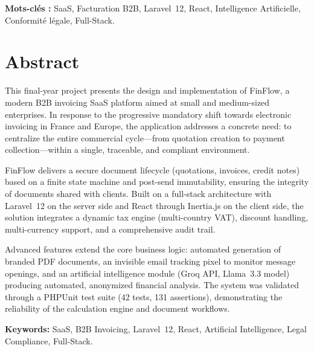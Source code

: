 \documentclass[12pt,a4paper]{report}
\begin{document}
\vspace{1em}
\noindent\textbf{Mots-clés :} SaaS, Facturation B2B, Laravel~12, React, Intelligence Artificielle, Conformité légale, Full-Stack.

\chapter*{Abstract}

This final-year project presents the design and implementation of FinFlow, a modern B2B invoicing SaaS platform aimed at small and medium-sized enterprises. In response to the progressive mandatory shift towards electronic invoicing in France and Europe, the application addresses a concrete need: to centralize the entire commercial cycle---from quotation creation to payment collection---within a single, traceable, and compliant environment.

FinFlow delivers a secure document lifecycle (quotations, invoices, credit notes) based on a finite state machine and post-send immutability, ensuring the integrity of documents shared with clients. Built on a full-stack architecture with Laravel~12 on the server side and React through Inertia.js on the client side, the solution integrates a dynamic tax engine (multi-country VAT), discount handling, multi-currency support, and a comprehensive audit trail.

Advanced features extend the core business logic: automated generation of branded PDF documents, an invisible email tracking pixel to monitor message openings, and an artificial intelligence module (Groq API, Llama~3.3 model) producing automated, anonymized financial analysis. The system was validated through a PHPUnit test suite (42 tests, 131 assertions), demonstrating the reliability of the calculation engine and document workflows.

\vspace{1em}
\noindent\textbf{Keywords:} SaaS, B2B Invoicing, Laravel~12, React, Artificial Intelligence, Legal Compliance, Full-Stack.

\cleardoublepage

\tableofcontents
\listoffigures
\listoftables
\renewcommand{\lstlistlistingname}{Liste des extraits de code}
\lstlistoflistings
\cleardoublepage
{}

\end{document}
